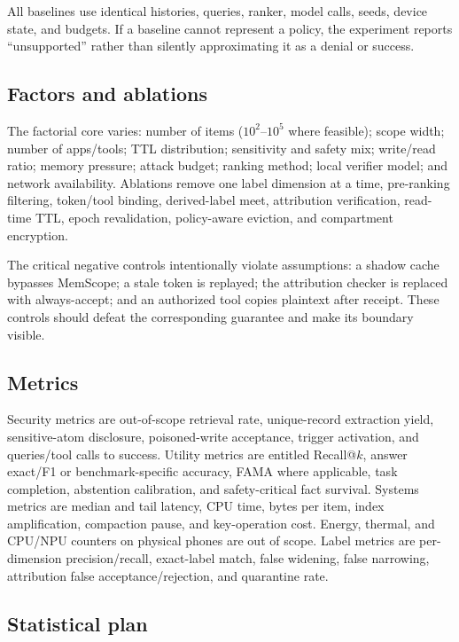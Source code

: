 All baselines use identical histories, queries, ranker, model calls, seeds, device state, and budgets. If a baseline cannot represent a policy, the experiment reports ``unsupported'' rather than silently approximating it as a denial or success.

\subsection{Factors and ablations}

The factorial core varies: number of items ($10^2$--$10^5$ where feasible); scope width; number of apps/tools; TTL distribution; sensitivity and safety mix; write/read ratio; memory pressure; attack budget; ranking method; local verifier model; and network availability. Ablations remove one label dimension at a time, pre-ranking filtering, token/tool binding, derived-label meet, attribution verification, read-time TTL, epoch revalidation, policy-aware eviction, and compartment encryption.

The critical negative controls intentionally violate assumptions: a shadow cache bypasses MemScope; a stale token is replayed; the attribution checker is replaced with always-accept; and an authorized tool copies plaintext after receipt. These controls should defeat the corresponding guarantee and make its boundary visible.

\subsection{Metrics}

Security metrics are out-of-scope retrieval rate, unique-record extraction yield, sensitive-atom disclosure, poisoned-write acceptance, trigger activation, and queries/tool calls to success. Utility metrics are entitled Recall@$k$, answer exact/F1 or benchmark-specific accuracy, FAMA where applicable, task completion, abstention calibration, and safety-critical fact survival. Systems metrics are median and tail latency, CPU time, bytes per item, index amplification, compaction pause, and key-operation cost. Energy, thermal, and CPU/NPU counters on physical phones are out of scope. Label metrics are per-dimension precision/recall, exact-label match, false widening, false narrowing, attribution false acceptance/rejection, and quarantine rate.

\subsection{Statistical plan}


